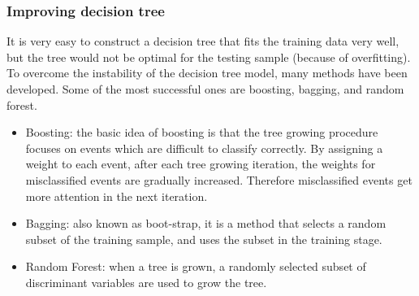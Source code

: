 \subsubsection{Improving decision tree}



It is very easy to construct a decision tree that fits the training data very well, but the tree would not be optimal for the testing sample (because of overfitting). To overcome the instability of the decision tree model, many methods have been developed. Some of the most successful ones are boosting, bagging, and random forest.

\begin{itemize}
  \item Boosting: the basic idea of boosting is that the tree growing procedure focuses on events which are difficult to classify correctly. By assigning a weight to each event,   after each tree growing iteration, the weights for misclassified events are gradually increased. Therefore misclassified events get more attention in the next iteration.
  \item Bagging: also known as boot-strap, it is a method that selects a  random subset of the training sample, and uses the subset in the training stage.
  \item Random Forest: when a tree is grown, a randomly selected subset of discriminant variables are used to grow the tree. %
\end{itemize}






